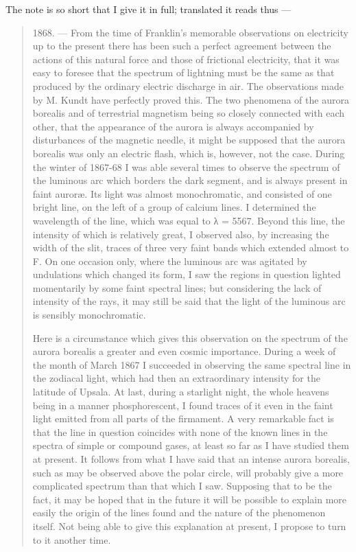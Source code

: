 \documentclass[a4paper, 12pt, oneside, polutonikogreek, english]{article}
\begin{document}
The note is so short that I give it in full; translated it reads thus ---
\begin{quotation}
1868. --- From the time of Franklin's memorable observations on electricity up to the present there has been such a perfect agreement between the actions of this natural force and those of frictional electricity, that it was easy to foresee that the spectrum of lightning must be the same as that produced by the ordinary electric discharge in air. The observations made by M. Kundt have perfectly proved this. The two phenomena of the aurora borealis and of terrestrial magnetism being so closely connected with each other, that the appearance of the aurora is always accompanied by disturbances of the magnetic needle, it might be supposed that the aurora borealis was only an electric flash, which is, however, not the case. During the winter of 1867-68 I was able several times to observe the spectrum of the luminous arc which borders the dark segment, and is always present in faint auroræ. Its light was almost monochromatic, and consisted of one bright line, on the left of a group of calcium lines. I determined the wavelength of the line, which was equal to λ = 5567. Beyond this line, the intensity of which is relatively great, I observed also, by increasing the width of the slit, traces of three very faint bands which extended almost to F. On one occasion only, where the luminous arc was agitated by undulations which changed its form, I saw the regions in question lighted momentarily by some faint spectral lines; but considering the lack of intensity of the rays, it may still be said that the light of the luminous arc is sensibly monochromatic.

Here is a circumstance which gives this observation on the spectrum of the aurora borealis a greater and even cosmic importance. During a week of the month of March 1867 I succeeded in observing the same spectral line in the zodiacal light, which had then an extraordinary intensity for the latitude of Upsala. At last, during a starlight night, the whole heavens being in a manner phosphorescent, I found traces of it even in the faint light emitted from all parts of the firmament. A very remarkable fact is that the line in question coincides with none of the known lines in the spectra of simple or compound gases, at least so far as I have studied them at present. It follows from what I have said that an intense aurora borealis, such as may be observed above the polar circle, will probably give a more complicated spectrum than that which I saw. Supposing that to be the fact, it may be hoped that in the future it will be possible to explain more easily the origin of the lines found and the nature of the phenomenon itself. Not being able to give this explanation at present, I propose to turn to it another time.
\end{quotation}
\end{document}
